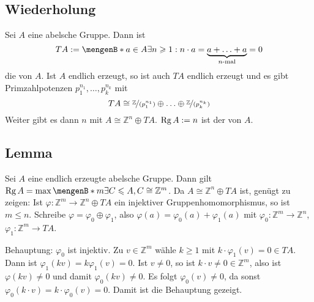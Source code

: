 \subsection[Wiederholung: Torsionsgruppe]{Wiederholung} %
\label{sub:41}
Sei $A$ eine abelsche Gruppe. Dann ist 
\[
	T A := \set[a \in A]{\exists n \ge 1 : n \cdot a = \underbrace{a + \ldots + a}_{\text{$n$-mal}} = 0} 
\]
die  von $A$. Ist $A$ endlich erzeugt, so ist auch $TA$ endlich erzeugt und es gibt Primzahlpotenzen $p_1^{n_1}, \ldots , p_k^{n_k}$ mit
\[
	TA \cong \nicefrac{\mathds{Z}}{(p_1^{n_1})} \oplus \ldots \oplus \nicefrac{\mathds{Z}}{(p_k^{n_k})}
\]
Weiter gibt es dann $n$ mit $A \cong \mathds{Z}^n \oplus TA$. $\Rg A := n$ ist der  von $A$.

\subsection[Lemma: Rang einer endlich erzeugten abelschen Gruppe]{Lemma} %
\label{sub:42}
Sei $A$ eine endlich erzeugte abelsche Gruppe. Dann gilt $\Rg A = \max \set[m]{\exists C \le A, C \cong \mathds{Z}^m}$.
Da $A \cong \mathds{Z}^n \oplus T A$ ist, genügt zu zeigen: Ist $\varphi : \mathds{Z}^m \to \mathds{Z}^n \oplus T A$ ein injektiver Gruppenhomomorphismus, so ist $m \le n$.
Schreibe $\varphi = \varphi_0 \oplus \varphi_1$, also $\varphi(a) = \varphi_0(a) + \varphi_1(a)$ mit $\varphi_0 : \mathds{Z}^m \to \mathds{Z}^n$, 
$\varphi_1 : \mathds{Z}^m \to T A$. 

Behauptung: $\varphi_0$ ist injektiv. Zu $v \in \mathds{Z}^m$ wähle $k\ge 1$ mit $k \cdot \varphi_1(v) = 0 \in T A$. Dann ist $\varphi_1(k v) = k \varphi_1(v)=0$.
Ist $v \not= 0$, so ist $k \cdot v \not= 0 \in \mathds{Z}^m$, also ist $\varphi(k v) \not= 0$ und damit $\varphi_0(k v) \not= 0$. Es folgt $\varphi_0(v) \not= 0$, da sonst
$\varphi_0(k \cdot v) = k \cdot \varphi_0(v)= 0$. Damit ist die Behauptung gezeigt.

